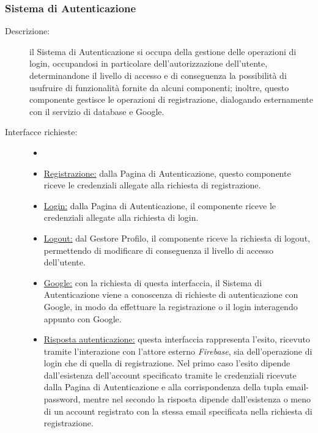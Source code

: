 \documentclass[11pt, a4paper]{article}
\theoremstyle{definition} %
\begin{document}
\subsubsection{Sistema di Autenticazione}
\begin{description}
    \item[Descrizione:] il Sistema di Autenticazione si occupa della
    gestione delle operazioni di login, occupandosi in particolare
    dell'autorizzazione dell'utente, determinandone il livello di
    accesso e di conseguenza la possibilità di usufruire di funzionalità
    fornite da alcuni componenti; inoltre, questo componente gestisce
    le operazioni di registrazione, dialogando esternamente con il
    servizio di database e Google.

    \item[Interfacce richieste:]
    \begin{itemize}
        \item[]

        \item \underline{Registrazione:} dalla Pagina di Autenticazione,
        questo componente riceve le credenziali allegate alla richiesta
        di registrazione.

        \item \underline{Login:} dalla Pagina di Autenticazione, il
        componente riceve le credenziali allegate alla richiesta di
        login.
        
        \item \underline{Logout:} dal Gestore Profilo, il componente
        riceve la richiesta di logout, permettendo di modificare di
        conseguenza il livello di accesso dell'utente.

        \item \underline{Google:} con la richiesta di questa interfaccia,
        il Sistema di Autenticazione viene a conoscenza di richieste di
        autenticazione con Google, in modo da effettuare la registrazione
        o il login interagendo appunto con Google.

        \item \underline{Risposta autenticazione:} questa interfaccia
        rappresenta l'esito, ricevuto tramite l'interazione con
        l'attore esterno \textit{Firebase}, sia dell'operazione di
        login che di quella di registrazione. Nel primo caso l'esito
        dipende dall'esistenza dell'account specificato tramite le
        credenziali ricevute dalla Pagina di Autenticazione e alla
        corrispondenza della tupla email-password, mentre
        nel secondo la risposta dipende dall'esistenza o meno di
        un account registrato con la stessa email specificata nella
        richiesta di registrazione.


\end{itemize}
\end{description}
\end{document}

